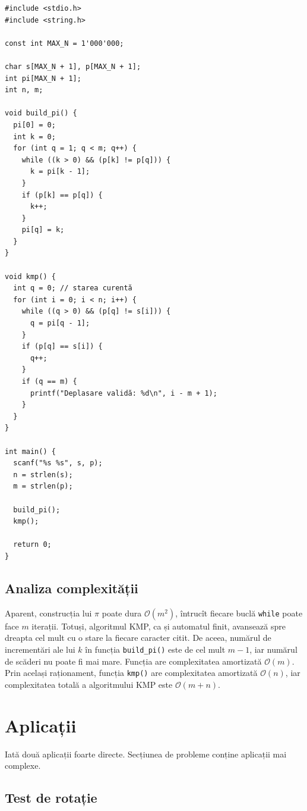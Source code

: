 \documentclass[../main.tex]{subfiles}
\begin{document}
\begin{verbatim}
#include <stdio.h>
#include <string.h>

const int MAX_N = 1'000'000;

char s[MAX_N + 1], p[MAX_N + 1];
int pi[MAX_N + 1];
int n, m;

void build_pi() {
  pi[0] = 0;
  int k = 0;
  for (int q = 1; q < m; q++) {
    while ((k > 0) && (p[k] != p[q])) {
      k = pi[k - 1];
    }
    if (p[k] == p[q]) {
      k++;
    }
    pi[q] = k;
  }
}

void kmp() {
  int q = 0; // starea curentă
  for (int i = 0; i < n; i++) {
    while ((q > 0) && (p[q] != s[i])) {
      q = pi[q - 1];
    }
    if (p[q] == s[i]) {
      q++;
    }
    if (q == m) {
      printf("Deplasare validă: %d\n", i - m + 1);
    }
  }
}

int main() {
  scanf("%s %s", s, p);
  n = strlen(s);
  m = strlen(p);

  build_pi();
  kmp();

  return 0;
}
\end{verbatim}


\subsection{Analiza complexității}

Aparent, construcția lui $\pi$ poate dura $\mathcal{O}(m^2)$, întrucît fiecare
buclă \texttt{while} poate face $m$ iterații. Totuși, algoritmul KMP,
ca și automatul finit, avansează spre dreapta cel mult cu o stare la fiecare
caracter citit. De aceea, numărul de incrementări ale lui $k$ în funcția
\texttt{build_pi()} este de cel mult $m-1$, iar numărul de
scăderi nu poate fi mai mare. Funcția are complexitatea amortizată
$\mathcal{O}(m)$. Prin același raționament, funcția \texttt{kmp()} are
complexitatea amortizată $\mathcal{O}(n)$, iar complexitatea totală a
algoritmului KMP este $\mathcal{O}(m + n)$.

\section{Aplicații}

Iată două aplicații foarte directe. Secțiunea de probleme conține aplicații mai complexe.

\subsection*{Test de rotație}
\end{document}
